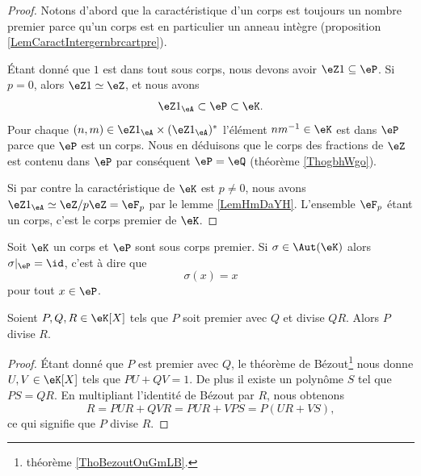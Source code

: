 \begin{proof}
    Notons d'abord que la caractéristique d'un corps est toujours un nombre premier parce qu'un corps est en particulier un anneau intègre (proposition \ref{LemCaractIntergernbrcartpre}).

    Étant donné que \( 1\) est dans tout sous corps, nous devons avoir \( \eZ 1\subseteq \eP\). Si \( p=0\), alors \( \eZ 1\simeq \eZ\), et nous avons
    \begin{equation}
        \eZ 1_{\eA}\subset \eP\subset \eK.
    \end{equation}
    Pour chaque \( (n,m)\in \eZ 1_{\eA}\times (\eZ 1_{\eA})^*\) l'élément \( nm^{-1}\in \eK\) est dans \( \eP\) parce que \( \eP\) est un corps. Nous en déduisons que le corps des fractions de \( \eZ\) est contenu dans \( \eP\) par conséquent \( \eP=\eQ\) (théorème \ref{ThogbhWgo}). 

    Si par contre la caractéristique de \( \eK\) est \( p\neq 0\), nous avons \( \eZ 1_{\eA}\simeq\eZ/p\eZ=\eF_p\) par le lemme \ref{LemHmDaYH}. L'ensemble \( \eF_p\) étant un corps, c'est le corps premier de \( \eK\).
\end{proof}

\begin{proposition}     \label{PropqPPrgJ}
    Soit \( \eK\) un corps et \( \eP\) sont sous corps premier. Si \( \sigma\in\Aut(\eK)\) alors \( \sigma|_{\eP}=\id\), c'est à dire que
    \begin{equation}
        \sigma(x)=x
    \end{equation}
    pour tout \( x\in \eP\).
\end{proposition}

\begin{theorem}  \label{ThoLLgIsig}
    Soient \( P,Q,R\in \eK[X]\) tels que \( P\) soit premier avec \( Q\) et divise \( QR\). Alors \( P\) divise \( R\).
\end{theorem}

\begin{proof}
    Étant donné que \( P\) est premier avec \( Q\), le théorème de Bézout\footnote{théorème \ref{ThoBezoutOuGmLB}.} nous donne \( U,V\in \eK[X]\) tels que \( PU+QV=1\). De plus il existe un polynôme \( S\) tel que \( PS=QR\). En multipliant l'identité de Bézout par \( R\), nous obtenons
    \begin{equation}
        R=PUR+QVR=PUR+VPS=P(UR+VS),
    \end{equation}
    ce qui signifie que \( P\) divise \( R\).
\end{proof}

